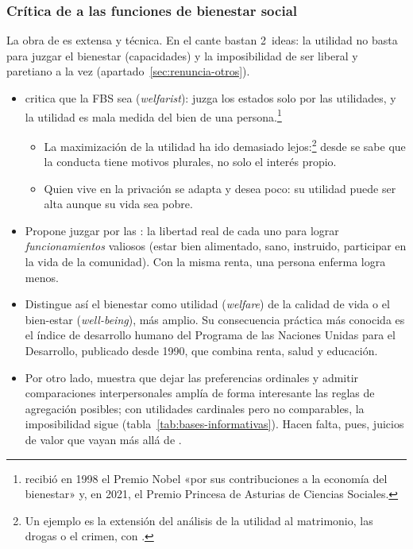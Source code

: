 \documentclass[11pt]{article}
\begin{document}
\subsubsection{Crítica de  a las funciones de bienestar social}\label{sec:sen}

\begin{notaopositor}
La obra de  es extensa y técnica. En el cante bastan 2~ideas: la utilidad no basta para juzgar el bienestar (capacidades) y la imposibilidad de ser liberal y paretiano a la vez (apartado~\ref{sec:renuncia-otros}).
\end{notaopositor}

\begin{itemize}
\item {} critica que la FBS sea  (\emph{welfarist}): juzga los estados solo por las utilidades, y la utilidad es mala medida del bien de una persona\nocite{Sen1979Personal}.\footnote{ recibió en 1998 el Premio Nobel «por sus contribuciones a la economía del bienestar»\nocite{Nobel1998Sen} y, en 2021, el Premio Princesa de Asturias de Ciencias Sociales\nocite{FPA2021Sen}.}
  \begin{itemize}
  \item La maximización de la utilidad ha ido demasiado lejos:\footnote{Un ejemplo es la extensión del análisis de la utilidad al matrimonio, las drogas o el crimen, con .} desde  se sabe que la conducta tiene motivos plurales, no solo el interés propio\nocite{Sen1977Rational}.
  \item Quien vive en la privación se adapta y desea poco: su utilidad puede ser alta aunque su vida sea pobre.
  \end{itemize}
\item Propone juzgar por las : la libertad real de cada uno para lograr \emph{funcionamientos} valiosos (estar bien alimentado, sano, instruido, participar en la vida de la comunidad). Con la misma renta, una persona enferma logra menos\nocite{Sen1985Commodities}.
\item Distingue así el bienestar como utilidad (\emph{welfare}) de la calidad de vida o el bien-estar (\emph{well-being}), más amplio. Su consecuencia práctica más conocida es el índice de desarrollo humano del Programa de las Naciones Unidas para el Desarrollo, publicado desde 1990, que combina renta, salud y educación\nocite{PNUD1990Human}.
\item Por otro lado, \textcite{Sen1970Collective} muestra que dejar las preferencias ordinales y admitir comparaciones interpersonales amplía de forma interesante las reglas de agregación posibles; con utilidades cardinales pero no comparables, la imposibilidad sigue (tabla~\ref{tab:bases-informativas}). Hacen falta, pues, juicios de valor que vayan más allá de .
\end{itemize}
\end{document}
